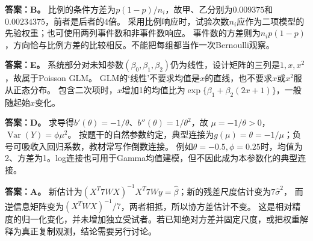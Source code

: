 \textbf{答案：B。} 比例的条件方差为$p(1-p)/n_i$，故甲、乙分别为$0.009375$和$0.00234375$，前者是后者的4倍。
采用比例响应时，试验次数$n_i$应作为二项模型的先验权重；也可使用两列事件数和非事件数响应。
事件数的方差则为$n_ip(1-p)$，方向恰与比例方差的比较相反。不能把每组都当作一次Bernoulli观察。
\par\nobreak\smallskip{}

\textbf{答案：E。} 系统部分对未知参数$(\beta_0,\beta_1,\beta_2)$仍为线性，设计矩阵的三列是$1,x,x^2$，故属于Poisson GLM。
GLM的‘线性’不要求均值是$x$的直线，也不要求$x$或$x^2$服从正态分布。
包含二次项时，$x$增加1的均值比为$\exp\{\beta_1+\beta_2(2x+1)\}$，一般随起始$x$变化。
\par\nobreak\smallskip{}

\textbf{答案：D。} 求导得$b'(\theta)=-1/\theta$、$b''(\theta)=1/\theta^2$，故
$\mu=-1/\theta>0$，$\operatorname{Var}(Y)=\phi\mu^2$。
按题干的自然参数约定，典型连接为$g(\mu)=\theta=-1/\mu$；负号可吸收入回归系数，教材常写作倒数连接。
例如$\theta=-0.5,\phi=0.25$时，均值为2、方差为1。log连接也可用于Gamma均值建模，但不因此成为本参数化的典型连接。
\par\nobreak\smallskip{}

\textbf{答案：A。} 新估计为$(X^T7WX)^{-1}X^T7Wy=\hat\beta$；新的残差尺度估计变为$7\hat\sigma^2$，
而逆信息矩阵变为$(X^TWX)^{-1}/7$，两者相抵，所以协方差估计不变。
这是相对精度的归一化变化，并未增加独立受试者。若已知绝对方差并固定尺度，或把权重解释为真正复制观测，结论需要另行讨论。
\par\nobreak\smallskip{}

